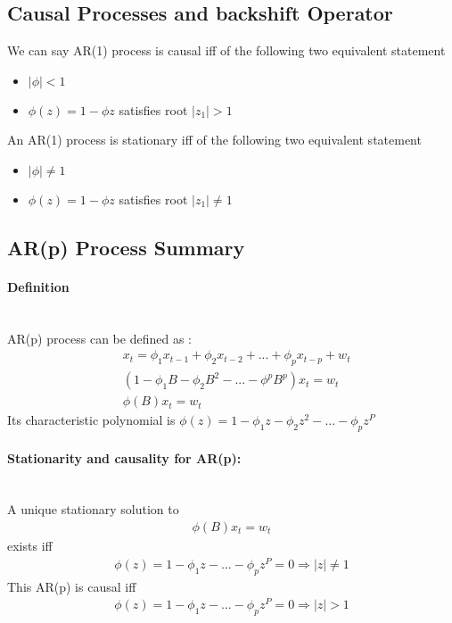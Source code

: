 \subsection{Causal Processes and backshift Operator}
We can say AR(1) process is causal iff of the following two equivalent statement 
    \begin{itemize}
        \item $|\phi|<1$ 
        \item $\phi(z) = 1 - \phi z$ satisfies root  $|z_1| > 1$
    \end{itemize}
An AR(1) process is stationary iff of the following two equivalent statement
    \begin{itemize}
        \item $|\phi|\neq 1$ 
        \item $\phi(z) = 1 - \phi z$ satisfies root  $|z_1| \neq  1$
    \end{itemize}
    
\subsection{AR(p) Process Summary}
\paragraph{Definition}\mbox{}\\
AR(p) process can be defined as : 
    \begin{align*}
        & x_t = \phi_1 x_{t-1} + \phi_2x_{t-2} + ... + \phi_p x_{t-p} + w_t\\
        & (1-\phi_1B - \phi_2B^2-...-\phi^pB^p)x_t = w_t \\
        & \phi(B)x_t = w_t
    \end{align*}
Its characteristic polynomial is $\phi(z) = 1 - \phi_1 z - \phi_2 z^2 - ... - \phi_p z^P$

\paragraph{Stationarity and causality for AR(p): }\mbox{}\\
A unique stationary solution to 
    \begin{align*}
        \phi(B)x_t = w_t
    \end{align*}
exists iff 
    \begin{align*}
        \phi(z) = 1 - \phi_1 z - ... - \phi_pz^P=0 \Longrightarrow |z| \neq 1
    \end{align*}
This AR(p) is causal iff 
    \begin{align*}
        \phi(z) = 1 - \phi_1 z - ... - \phi_pz^P=0 \Longrightarrow |z| > 1
    \end{align*}
    
